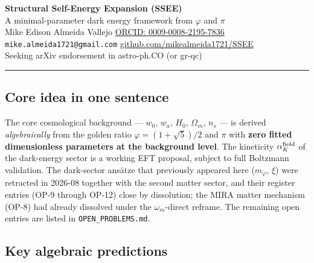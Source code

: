 \documentclass[11pt,a4paper]{article}
\begin{document}
\begin{center}
  {\Large\bfseries Structural Self-Energy Expansion (SSEE)}\\[4pt]
  {\large A minimal-parameter dark energy framework from $\varphi$ and $\pi$}\\[6pt]
  Mike Edison Almeida Vallejo \quad
  \href{https://orcid.org/0009-0008-2195-7836}{ORCID: 0009-0008-2195-7836}\\
  \texttt{mike.almeida1721@gmail.com} \quad
  \href{https://github.com/mikealmeida1721/SSEE}{github.com/mikealmeida1721/SSEE}\\[2pt]
  {\small\color{gray}Seeking arXiv endorsement in astro-ph.CO (or gr-qc)}
\end{center}

\hrule\vspace{6pt}

\subsection*{Core idea in one sentence}

The core cosmological background — $w_0$, $w_a$, $H_0$, $\Omega_m$, $n_s$ — is derived \emph{algebraically} from the
golden ratio $\varphi=(1+\sqrt{5})/2$ and $\pi$ with \textbf{zero fitted dimensionless parameters at the background level}. The kineticity $\alpha_K^{\rm field}$ of the dark-energy sector is a working
EFT proposal, subject to full Boltzmann validation. The dark-sector ans\"atze that previously appeared here ($m_\varphi$, $\xi$) were retracted in 2026-08 together with the second matter sector, and their register entries (OP-9 through OP-12) close by dissolution; the MIRA matter mechanism (OP-8) had already dissolved under the $\omega_m$-direct reframe. The remaining open entries are listed in \texttt{OPEN\_PROBLEMS.md}.

\subsection*{Key algebraic predictions}
\end{document}
